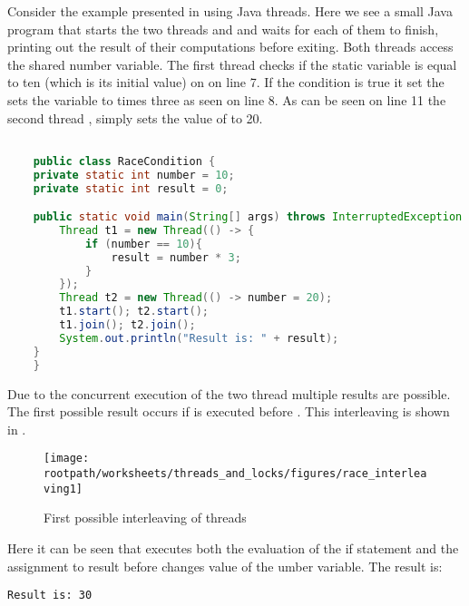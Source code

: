 Consider the example presented in  using Java threads. Here we see a small Java program that starts the two threads  and  and waits for each of them to finish, printing out the result of their computations before exiting. Both threads access the shared number variable. The first thread  checks if the static variable  is equal to ten (which is its initial value) on on line 7. If the condition is true it set the sets the  variable to  times three as seen on line 8. As can be seen on line 11 the second thread , simply sets the value of  to 20.

\begin{lstlisting}[label=lst:racecondition,
  caption={Race condition example},
  language=Java,  
  showspaces=false,
  showtabs=false,
  breaklines=true,
  showstringspaces=false,
  breakatwhitespace=true,
  commentstyle=\color{greencomments},
  keywordstyle=\color{bluekeywords},
  stringstyle=\color{redstrings}]  % Start your code-block

	public class RaceCondition {
    private static int number = 10;
    private static int result = 0;

    public static void main(String[] args) throws InterruptedException {
        Thread t1 = new Thread(() -> {
            if (number == 10){
                result = number * 3;
            }
        });
        Thread t2 = new Thread(() -> number = 20);
        t1.start(); t2.start();
        t1.join(); t2.join();
        System.out.println("Result is: " + result);
    }
	}
\end{lstlisting}

Due to the concurrent execution of the two thread multiple results are possible. The first possible result occurs if  is executed before . This interleaving is shown in . 

\begin{figure}[htbp]
\centering
 \texttt{[image: \\rootpath/worksheets/threads\_and\_locks/figures/race\_interleaving1]} 
 \caption{First possible interleaving of threads}
\label{fig:race_interleaving1}
\end{figure}

Here it can be seen that  executes both the evaluation of the if statement and the assignment to result before  changes value of the umber variable. The result is:
\begin{verbatim}
Result is: 30
\end{verbatim}

